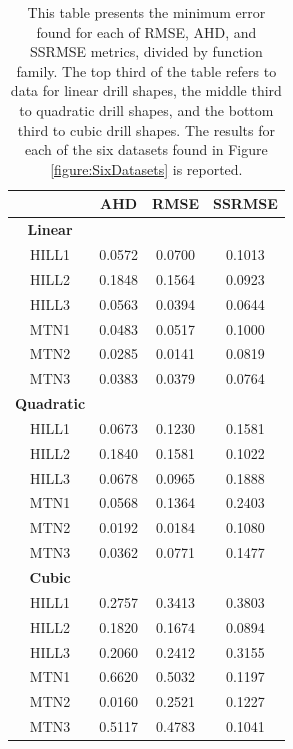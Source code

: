 \begin{table}[t]
  \centering
  \begin{tabular}{ | c | c | c | c | }
    \hline
      & \textbf{AHD} & \textbf{RMSE} & \textbf{SSRMSE} \\
    \hline
    \textbf{Linear}&&&  \\
    \hline
    HILL1 & 0.0572 & 0.0700 & 0.1013 \\
    HILL2 & 0.1848 & 0.1564 & 0.0923 \\
    HILL3 & 0.0563 & 0.0394 & 0.0644 \\
    MTN1 & 0.0483 & 0.0517 & 0.1000 \\
    MTN2 & 0.0285 & 0.0141 & 0.0819 \\
    MTN3 & 0.0383 & 0.0379 & 0.0764 \\
    \hline
    \textbf{Quadratic}&&& \\
    \hline
    HILL1 & 0.0673 & 0.1230 & 0.1581 \\
    HILL2 & 0.1840 & 0.1581 & 0.1022 \\
    HILL3 & 0.0678 & 0.0965 & 0.1888 \\
    MTN1 & 0.0568 & 0.1364 & 0.2403 \\
    MTN2 & 0.0192 & 0.0184 & 0.1080 \\
    MTN3 & 0.0362 & 0.0771 & 0.1477 \\
    \hline
    \textbf{Cubic}&&&  \\
    \hline
    HILL1 & 0.2757 & 0.3413 & 0.3803 \\
    HILL2 & 0.1820 & 0.1674 & 0.0894 \\
    HILL3 & 0.2060 & 0.2412 & 0.3155 \\
    MTN1 & 0.6620 & 0.5032 & 0.1197 \\
    MTN2 & 0.0160 & 0.2521 & 0.1227 \\
    MTN3 & 0.5117 & 0.4783 & 0.1041 \\
    \hline
  \end{tabular}
  \caption[Minimum error values in tests for different drill shape function families.]{\label{table:FamiliesOfFunctionsResults} This table presents the minimum error found for each of RMSE, AHD, and SSRMSE metrics, divided by function family. The top third of the table refers to data for linear drill shapes, the middle third to quadratic drill shapes, and the bottom third to cubic drill shapes. The results for each of the six datasets found in Figure \ref{figure:SixDatasets} is reported.}
\end{table}

